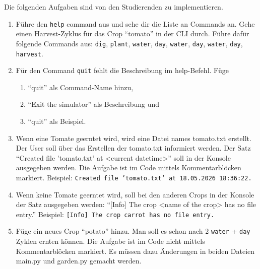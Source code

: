 Die folgenden Aufgaben sind von den Studierenden zu implementieren. 
\begin{enumerate}
  \item Führe den \texttt{help} command aus und sehe dir die Liste an Commands an. Gehe einen Harvest-Zyklus für das Crop \enquote{tomato} in der CLI durch. Führe dafür folgende Commands aus: \texttt{dig}, \texttt{plant}, \texttt{water}, \texttt{day}, \texttt{water}, \texttt{day}, \texttt{water}, \texttt{day}, \texttt{harvest}.
  \item Für den Command \texttt{quit} fehlt die Beschreibung im help-Befehl. Füge
  \begin{enumerate}
    \renewcommand{\labelenumii}{\roman{enumii}.}
    \item \enquote{quit} als Command-Name hinzu,
    \item \enquote{Exit the simulator} als Beschreibung und
    \item \enquote{quit} als Beispiel.
  \end{enumerate}
  \item Wenn eine Tomate geerntet wird, wird eine Datei names tomato.txt erstellt. Der User soll über das Erstellen der tomato.txt informiert werden. Der Satz \enquote{Created file 'tomato.txt' at <current datetime>} soll in der Konsole ausgegeben werden. Die Aufgabe ist im Code mittels Kommentarblöcken markiert.
  \newline
  Beispiel:
  \newline
  \texttt{Created file 'tomato.txt' at 18.05.2026 18:36:22.}

  \item Wenn keine Tomate geerntet wird, soll bei den anderen Crops in der Konsole der Satz ausgegeben werden: \enquote{[Info] The crop <name of the crop> has no file entry.}
  \newline
  Beispiel:
  \newline
  \texttt{[Info] The crop carrot has no file entry.}

  \item Füge ein neues Crop \enquote{potato} hinzu. Man soll es schon nach 2 \texttt{water} + \texttt{day} Zyklen ernten können. Die Aufgabe ist im Code nicht mittels Kommentarblöcken markiert. Es müssen dazu Änderungen in beiden Dateien main.py und garden.py gemacht werden.

\end{enumerate}

